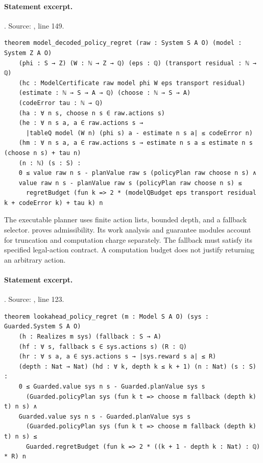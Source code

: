 \documentclass[11pt]{article}
\begin{document}
\paragraph{Statement excerpt.}. Source: , line 149.
\begin{lstlisting}[style=AVOCSource]
theorem model_decoded_policy_regret (raw : System S A O) (model : System Z A O)
    (phi : S → Z) (W : ℕ → Z → ℚ) (eps : ℚ) (transport residual : ℕ → ℚ)
    (hc : ModelCertificate raw model phi W eps transport residual)
    (estimate : ℕ → S → A → ℚ) (choose : ℕ → S → A)
    (codeError tau : ℕ → ℚ)
    (ha : ∀ n s, choose n s ∈ raw.actions s)
    (he : ∀ n s a, a ∈ raw.actions s →
      |tableQ model (W n) (phi s) a - estimate n s a| ≤ codeError n)
    (hm : ∀ n s a, a ∈ raw.actions s → estimate n s a ≤ estimate n s (choose n s) + tau n)
    (n : ℕ) (s : S) :
    0 ≤ value raw n s - planValue raw s (policyPlan raw choose n s) ∧
    value raw n s - planValue raw s (policyPlan raw choose n s) ≤
      regretBudget (fun k => 2 * (modelQBudget eps transport residual k + codeError k) + tau k) n
\end{lstlisting}


The executable planner uses finite action lists, bounded depth, and a fallback
selector.  proves admissibility. Its work analysis and
guarantee modules account for truncation and computation charge separately.
The fallback must satisfy its specified legal-action contract. A computation
budget does not justify returning an arbitrary action.

\paragraph{Statement excerpt.}. Source: , line 123.
\begin{lstlisting}[style=AVOCSource]
theorem lookahead_policy_regret (m : Model S A O) (sys : Guarded.System S A O)
    (h : Realizes m sys) (fallback : S → A)
    (hf : ∀ s, fallback s ∈ sys.actions s) (R : ℚ)
    (hr : ∀ s a, a ∈ sys.actions s → |sys.reward s a| ≤ R)
    (depth : Nat → Nat) (hd : ∀ k, depth k ≤ k + 1) (n : Nat) (s : S) :
    0 ≤ Guarded.value sys n s - Guarded.planValue sys s
      (Guarded.policyPlan sys (fun k t => choose m fallback (depth k) t) n s) ∧
    Guarded.value sys n s - Guarded.planValue sys s
      (Guarded.policyPlan sys (fun k t => choose m fallback (depth k) t) n s) ≤
      Guarded.regretBudget (fun k => 2 * ((k + 1 - depth k : Nat) : ℚ) * R) n
\end{lstlisting}
\end{document}
